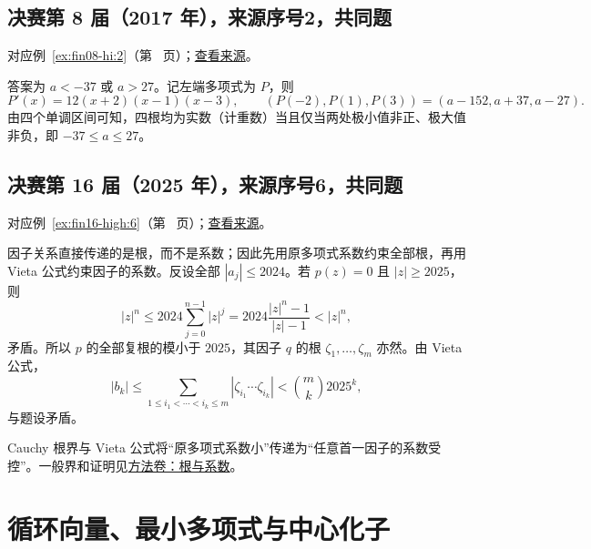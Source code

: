 \documentclass[UTF8,12pt,a4paper,fontset=fandol]{ctexart}
\begin{document}
\subsection{决赛第 8 届（2017 年），来源序号2，共同题}\label{ans:fin08-hi:2}\label{pr:fin08-hi:2}

对应例~\ref{ex:fin08-hi:2}（第~\pageref{ex:fin08-hi:2} 页）；\href{https://github.com/lzxcr/cmc-mathematics/blob/64916fa1fdbc3e444a652eca204d5669058ee321/src/problems/finals/08/02.md}{查看来源}。

\begin{solve}

答案为 $a<-37$ 或 $a>27$。记左端多项式为 $P$，则
\[
P'(x)=12(x+2)(x-1)(x-3),\qquad(P(-2),P(1),P(3))=(a-152,a+37,a-27).
\]
由四个单调区间可知，四根均为实数（计重数）当且仅当两处极小值非正、极大值非负，即 $-37\leq a\leq27$。

\end{solve}

\subsection{决赛第 16 届（2025 年），来源序号6，共同题}\label{ans:fin16-high:6}\label{pr:fin16-high:6}

对应例~\ref{ex:fin16-high:6}（第~\pageref{ex:fin16-high:6} 页）；\href{https://github.com/lzxcr/cmc-mathematics/blob/64916fa1fdbc3e444a652eca204d5669058ee321/src/problems/finals/16/06.md}{查看来源}。

\begin{solve}

因子关系直接传递的是根，而不是系数；因此先用原多项式系数约束全部根，再用 Vieta 公式约束因子的系数。反设全部 $|a_j|\le2024$。若 $p(z)=0$ 且 $|z|\ge2025$，则
\[
|z|^n\le2024\sum_{j=0}^{n-1}|z|^j
=2024\frac{|z|^n-1}{|z|-1}<|z|^n,
\]
矛盾。所以 $p$ 的全部复根的模小于 $2025$，其因子 $q$ 的根 $\zeta_1,\dots,\zeta_m$ 亦然。由 Vieta 公式，
\[
|b_k|\le\sum_{1\le i_1<\cdots<i_k\le m}|\zeta_{i_1}\cdots\zeta_{i_k}|
<\binom mk2025^k,
\]
与题设矛盾。

\end{solve}

\begin{remark}[方法与条件]

Cauchy 根界与 Vieta 公式将“原多项式系数小”传递为“任意首一因子的系数受控”。一般界和证明见\hyperref[app:algebra-roots]{方法卷：根与系数}。

\end{remark}

\section{循环向量、最小多项式与中心化子}
\end{document}
